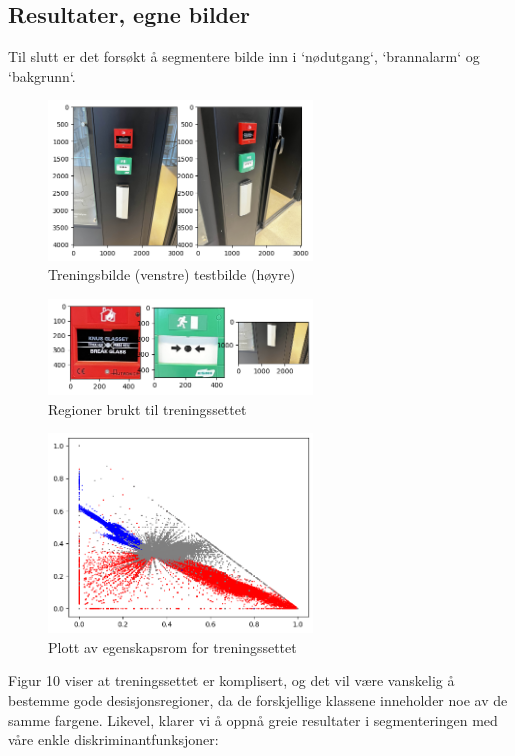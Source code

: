 \documentclass{article}
\begin{document}
\newpage
\subsection*{Resultater, egne bilder}
Til slutt er det forsøkt å segmentere bilde inn i `nødutgang`, `brannalarm` og `bakgrunn`.
\begin{figure}[h]
    \centering
    \includegraphics[width=7cm]{egne}
    \caption{Treningsbilde (venstre) testbilde (høyre)}
\end{figure}
\begin{figure}[h]
    \centering
    \includegraphics[width=7cm]{egne_regioner}
    \caption{Regioner brukt til treningssettet}
\end{figure}
\begin{figure}[h!]
    \centering
    \includegraphics[width=7cm]{egne_egenskapsrom}
    \caption{Plott av egenskapsrom for treningssettet}
\end{figure}

\newpage
Figur 10 viser at treningssettet er komplisert, og det vil være
vanskelig å bestemme gode desisjonsregioner, da de forskjellige klassene
inneholder noe av de samme fargene. Likevel, klarer vi å oppnå greie resultater i segmenteringen
med våre enkle diskriminantfunksjoner:
\end{document}
